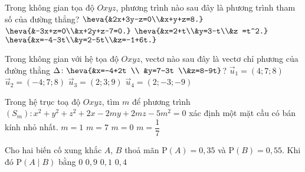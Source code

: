 \begin{ex}%
Trong không gian tọa độ $Oxyz$, phương trình nào sau đây là phương trình tham số của đường thẳng?
\def\dotEX{}
\choice
{$\heva{&2x+3y-z=0\\&x+y+z=8.}$}
{$\heva{&-3x+z=0\\&x+2y+z-7=0.}$}
{$\heva{&x=2+t\\&y=3-t\\&z =t^2.}$}
{\True  $\heva{&x=-4-3t\\&y=2-5t\\&z=-1+6t.}$}
\end{ex}

\begin{ex}%
Trong không gian với hệ tọa độ $Oxyz$, vectơ nào sau đây là vectơ chỉ phương của đường thẳng $\Delta\colon\heva{&x=-4+2t \\ &y=7-3t \\&z=8-9t}$?
\choice
{$\vec{u}_1=(4;7;8)$}
{$\vec{u}_2=(-4;7;8)$}
{$\vec{u}_3=(2;3;9)$}
{\True $\vec{u}_4=(2;-3;-9)$}
\end{ex}

\begin{ex}%
Trong hệ trục toạ độ $Oxyz$, tìm $m$ để phương trình $(S_m) \colon x^2+y^2+z^2+2x-2my+2mz-5m^2 = 0$ xác định một mặt cầu có bán kính nhỏ nhất.
\choice
{$m=1$}
{$m=7$}
{\True $m=0$}
{$m=\dfrac{1}{7}$}
\end{ex}

\begin{ex}%
Cho hai biến cố xung khắc $A$, $B$ thoả mãn $\mathrm{P}(A)=0{,}35$ và $\mathrm{P}(B)=0{,}55$. Khi đó $\mathrm{P}(A\mid B)$ bằng
\choice
{\True $0$}
{$0{,}9$}
{$0{,}1$}
{$0{,}4$}
\end{ex}

